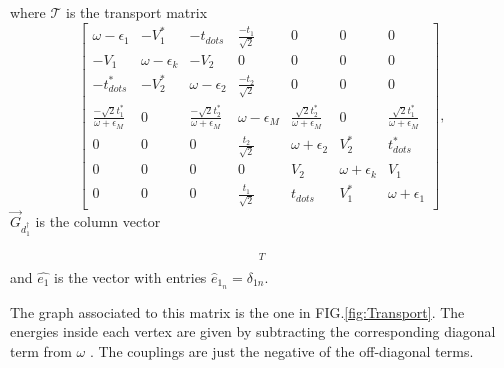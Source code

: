 \documentclass[showpacs,aps,prb,reprint,superscriptaddress]{revtex4-1}
\begin{document}
\noindent where $\mathcal{T}$ is the transport matrix 
\begin{equation}
\left[\begin{array}{ccccccc}
\omega-\epsilon_{1} & -V_{1}^{*} & -t_{dots} & \frac{-t_{1}}{\sqrt{2}} & 0 & 0 & 0\\
-V_{1} & \omega-\epsilon_{k} & -V_{2} & 0 & 0 & 0 & 0\\
-t_{dots}^{*} & -V_{2}^{*} & \omega-\epsilon_{2} & \frac{-t_{2}}{\sqrt{2}} & 0 & 0 & 0\\
\frac{-\sqrt{2}t_{1}^{*}}{\omega+\epsilon_{M}} & 0 & \frac{-\sqrt{2}t_{2}^{*}}{\omega+\epsilon_{M}} & \omega-\epsilon_{M} & \frac{\sqrt{2}t_{2}^{*}}{\omega+\epsilon_{M}} & 0 & \frac{\sqrt{2}t_{1}^{*}}{\omega+\epsilon_{M}}\\
0 & 0 & 0 & \frac{t_{2}}{\sqrt{2}} & \omega+\epsilon_{2} & V_{2}^{*} & t_{dots}^{*}\\
0 & 0 & 0 & 0 & V_{2} & \omega+\epsilon_{k} & V_{1}\\
0 & 0 & 0 & \frac{t_{1}}{\sqrt{2}} & t_{dots} & V_{1}^{*} & \omega+\epsilon_{1}
\end{array}\right],
\label{eq:TransportMatrix}
\end{equation}
 \noindent $\vec{G}_{d^\dagger_1}$  is the column vector
 
 \begin{align*}
    [ \Green{d_{\mathbf{1\downarrow}},d_{1\downarrow}^{\dagger}},&\Green{c_{k\downarrow},d_{1\downarrow}^{\dagger}},\Green{d_{2\downarrow},d_{1\downarrow}^{\dagger}},\Green{f_{\downarrow},  d_{1\downarrow}^{\dagger}}, \\ & \Green{d_{2\downarrow}^{\dagger},d_{1\downarrow}^{\dagger}},\Green{c_{k\downarrow}^{\dagger},d_{1\downarrow}^{\dagger}},\Green{d_{1\downarrow}^{\dagger},d_{1\downarrow}^{\dagger}} ]^T
 \end{align*}
and $\hat{e_1}$ is the vector with entries  $\hat{e}_{1_n} =\delta_{1n}$. 

The graph associated to this matrix is the one in FIG.\ref{fig:Transport}. The energies inside each vertex are given by subtracting the corresponding diagonal term from $\omega$ . The couplings are just the negative of the off-diagonal terms. 
\end{document}
